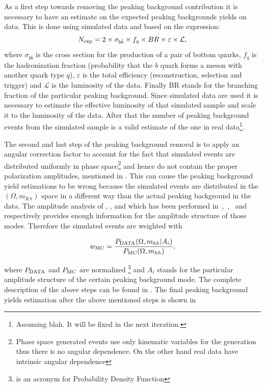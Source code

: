 As a first step towards removing the peaking background contribution it is necessary to have an estimate on the expected
peaking backgrounds yields on data. This is done using simulated data and based on the expression:
\begin{equation}
N_{\rm exp} = 2 \times \sigma_{b\bar{b}}\times f_q \times BR \times \varepsilon \times {\mathcal{L}},
\end{equation}
\noindent where $\sigma_{b\bar{b}}$ is the cross section for the production of a pair of bottom quarks, $f_q$ is the hadronization fraction
(probability that the $b$ quark forms a meson with another quark type $q$), $\varepsilon$ is the total efficiency (reconstruction, selection and trigger)
and ${\mathcal{L}}$ is the luminosity of the data. Finally BR stands for the branching fraction of the particular peaking background. Since simulated data are used
it is necessary to estimate the effective luminosity of that simulated sample and scale it to the luminosity of the data. After that the number of
peaking background events from the simulated sample is a valid estimate of the one in real
data\footnote{Assuming blah. {\color{red} It will be fixed in the next iteration.}}.

The second and last step of the peaking background removal is to apply an angular correction factor to account for the fact that
simulated events are distributed uniformly in phase
space\footnote{Phase space generated events use only kinematic variables for the generation
thus there is no angular dependence. On the other hand real data have intrinsic angular dependence}
and hence do not contain the proper polarization amplitudes, mentioned in .
This can cause the peaking background yield estimations to be wrong because the simulated events are distributed in the $(\Omega, m_{K\pi})$ space
in a different way than the actual peaking background in the data. The amplitude analysis of \BdJpsipipi, \BsJpsipipi, \BsJpsiKK and \LbJpsipK
which has been performed in~\cite{SheldonBdpipi},~\cite{SheldonBspipi},~\cite{SheldonKK} and~\cite{Gao:1701984} respectively provides enough information
for the amplitude structure of those modes. Therefore the simulated events are weighted with

\begin{equation}
w_{\rm MC} = \frac{P_{\rm DATA} (\Omega, m_{hh}  | {A_i})}{P_{\rm MC}(\Omega, m_{hh})},
\end{equation}

\noindent where $P_{\rm DATA}$ and $P_{\rm MC}$ are normalized \pdfs\footnote{\pdf is an acronym for Probability Density Function} and $A_i$ stands for
the particular amplitude structure of the certain peaking background mode. The complete description of the above steps can be found in \cite{BsJpsiKst_ANA}.
The final peaking background yields estimation after the above mentioned steps is shown in 

